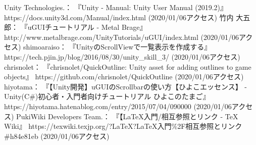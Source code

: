 \documentclass[12pt]{jarticle}
\begin{document}
\begin{thebibliography}{99}
 Unity Technologies.： 『Unity - Manual: Unity User Manual (2019.2)』 https://docs.unity3d.com/Manual/index.html (2020/01/06アクセス)
 竹内 大五郎： 『uGUIチュートリアル - Metal Brage』 http://www.metalbrage.com/UnityTutorials/uGUI/index.html (2020/01/06アクセス)
 shimoaraiso： 『UnityのScrollViewで一覧表示を作成する』 https://tech.pjin.jp/blog/2016/08/30/unity\_skill\_3/ (2020/01/06アクセス)
 chrisnolet： 『chrisnolet/QuickOutline: Unity asset for adding outlines to game objects』 https://github.com/chrisnolet/QuickOutline (2020/01/06アクセス)
 hiyotama： 『【Unity開発】uGUIのScrollbarの使い方【ひよこエッセンス】 - Unity(C\#)初心者・入門者向けチュートリアル ひよこのたまご』 https://hiyotama.hatenablog.com/entry/2015/07/04/090000 (2020/01/06アクセス)
 PukiWiki Developers Team.： 『【LaTeX入門/相互参照とリンク - TeX Wiki』 https://texwiki.texjp.org/?LaTeX?LaTeX入門\%2F相互参照とリンク\#h84e81eb (2020/01/06アクセス)
\end{thebibliography}
\end{document}
